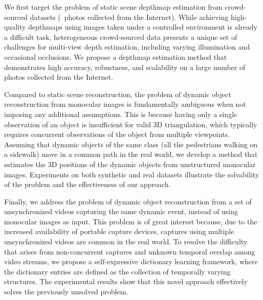We first target the problem of static scene depthmap estimation from crowd-sourced datasets (\ie~photos collected from the Internet). While achieving high-quality depthmaps using images taken under a controlled environment is already a difficult task, heterogeneous crowd-sourced data presents a unique set of challenges for multi-view depth estimation, including varying illumination and occasional occlusions. We propose a depthmap estimation method that demonstrates high accuracy, robustness, and scalability on a large number of photos collected from the Internet.
 
Compared to static scene reconstruction, the problem of dynamic object reconstruction from monocular images is fundamentally ambiguous when not imposing any additional assumptions. This is because having only a single observation of an object is insufficient for valid 3D triangulation, which typically requires concurrent observations of the object from multiple viewpoints. Assuming that dynamic objects of the same class (\eg all the pedestrians walking on a sidewalk) move in a common path in the real world, we develop a method that estimates the 3D positions of the dynamic objects from unstructured monocular images. Experiments on both synthetic and real datasets illustrate the solvability of the problem and the effectiveness of our approach.

Finally, we address the problem of dynamic object reconstruction from a set of unsynchronized videos capturing the same dynamic event, instead of using monocular images as input. This problem is of great interest because, due to the increased availability of portable capture devices, captures using multiple unsynchronized videos are common in the real world. To resolve the difficulty that arises from non-concurrent captures and unknown temporal overlap among video streams, we propose a self-expressive dictionary learning framework, where the dictionary entries are defined as the collection of temporally varying structures. The experimental results show that this novel approach effectively solves the previously unsolved problem.


\clearpage

